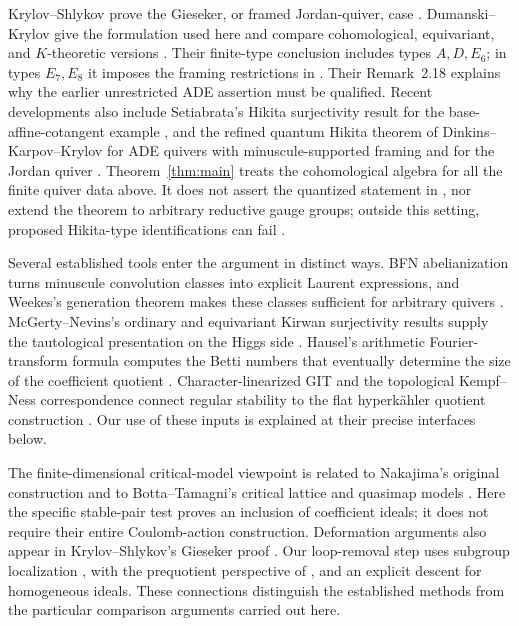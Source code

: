 Krylov--Shlykov prove the Gieseker, or framed Jordan-quiver, case
\cite{KrylovShlykov25}.  Dumanski--Krylov give the formulation used here
and compare cohomological, equivariant, and $K$-theoretic versions
\cite{DK25}.  Their finite-type conclusion includes types $A,D,E_6$;
in types $E_7,E_8$ it imposes the framing restrictions in
\cite[Corollary~2.17]{DK25}.  Their Remark~2.18 explains why the earlier
unrestricted ADE assertion must be qualified.
Recent developments also include Setiabrata's Hikita surjectivity result
for the base-affine-cotangent example \cite{Setiabrata24}, and the refined quantum
Hikita theorem of Dinkins--Karpov--Krylov for ADE quivers with
minuscule-supported framing and for the Jordan quiver
\cite[Theorem~B]{DinkinsKarpovKrylov26}.
Theorem~\ref{thm:main} treats the cohomological algebra for all the finite
quiver data above.  It does not assert the quantized statement in
\cite[Equation~(2.2)]{DK25}, nor extend the theorem to arbitrary
reductive gauge groups; outside this setting, proposed Hikita-type
identifications can fail \cite[Example~6.7]{HoangKrylovMatvieievskyi24}.

Several established tools enter the argument in distinct ways.
BFN abelianization turns minuscule convolution classes into explicit
Laurent expressions, and Weekes's generation theorem makes these classes
sufficient for arbitrary quivers \cite{BFN18,BFN19,Weekes19}.
McGerty--Nevins's ordinary and equivariant Kirwan surjectivity results
supply the tautological presentation on the Higgs side
\cite[Theorem~1.2 and Corollary~1.5]{MN18}.
Hausel's arithmetic Fourier-transform formula computes the Betti numbers
that eventually determine the size of the coefficient quotient
\cite{Hausel06}.  Character-linearized GIT and the topological
Kempf--Ness correspondence connect regular stability to the flat
hyperk\"ahler quotient construction
\cite{King94,Hoskins14,HKLR87,Nakajima94}.
Our use of these inputs is explained at their precise interfaces below.

The finite-dimensional critical-model viewpoint is related to Nakajima's
original construction and to Botta--Tamagni's critical lattice and
quasimap models \cite{Nakajima16,BottaTamagni26}.  Here the specific
stable-pair test proves an inclusion of coefficient ideals; it does not
require their entire Coulomb-action construction.  Deformation arguments
also appear in Krylov--Shlykov's Gieseker proof
\cite[Remark~1.15]{KrylovShlykov25}.  Our loop-removal step uses subgroup
localization \cite{Brion98}, with the prequotient perspective of
\cite[Proposition~2.3]{DK25}, and an explicit descent for homogeneous
ideals.  These connections distinguish the established methods from the
particular comparison arguments carried out here.

